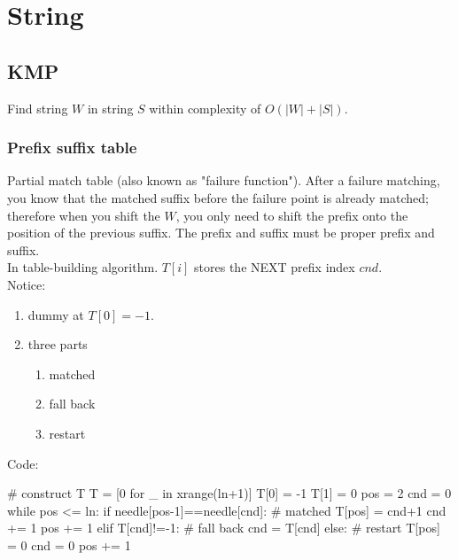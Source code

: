 \chapter{String}


\section{KMP}
Find string $W$ in string $S$ within complexity of $O(|W|+|S|)$.
\subsection{Prefix suffix table}
Partial match table (also known as "failure function"). After a failure matching, you know that the matched suffix before the failure point is already matched; therefore when you shift the $W$, you only need to shift the prefix onto the position of the previous suffix. The prefix and suffix must be proper prefix and suffix.\\

In table-building algorithm. $T[i]$ stores the NEXT prefix index $cnd$.\\

Notice:
\begin{enumerate}
\item dummy at $T[0]=-1$.
\item three parts
\begin{enumerate}
\item matched
\item fall back
\item restart 
\end{enumerate}
\end{enumerate}

Code:
\begin{python}
# construct T
T = [0 for _ in xrange(ln+1)]
T[0] = -1
T[1] = 0
pos = 2
cnd = 0  
while pos <= ln:
    if needle[pos-1]==needle[cnd]:  # matched
        T[pos] = cnd+1
        cnd += 1
        pos += 1
    elif T[cnd]!=-1:  # fall back 
        cnd = T[cnd]
    else:  # restart 
        T[pos] = 0
        cnd = 0
        pos += 1

\end{python}


